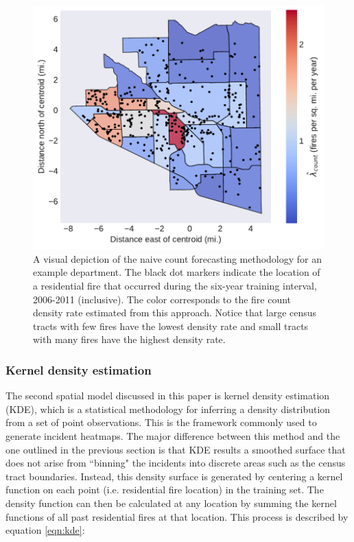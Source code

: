 \documentclass{svjour3}
\begin{document}
\begin{figure}[htb] \centering
\includegraphics[width=.75\textwidth]{./figures/spatial_histogram.pdf}
\caption{A visual depiction of the naive count forecasting methodology for an example department. The black dot markers indicate the location of a residential fire that occurred during the six-year training interval, 2006-2011 (inclusive). The color corresponds to the fire count density rate estimated from this approach. Notice that large census tracts with few fires have the lowest density rate and small tracts with many fires have the highest density rate.}
\label{fig:spatial_histogram}
\end{figure}

\subsubsection{Kernel density estimation}
\label{sec:kde}
The second spatial model discussed in this paper is kernel density estimation (KDE), which is a statistical methodology for inferring a density distribution from a set of point observations. This is the framework commonly used to generate incident heatmaps. The major difference between this method and the one outlined in the previous section is that KDE results  a smoothed surface that does not arise from ``binning" the incidents into discrete areas such as the census tract boundaries. Instead, this density surface is generated by centering a kernel function on each point (i.e. residential fire location) in the training set. The density function can then be calculated at any location by summing the kernel functions of all past residential fires at that location. This process is described by equation \ref{eqn:kde}:
\end{document}
